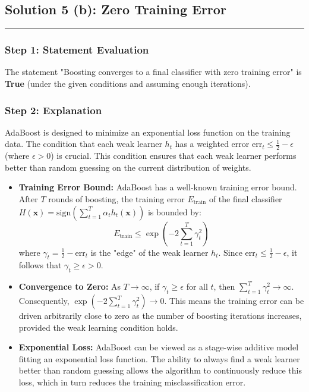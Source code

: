 \documentclass{article}
\begin{document}
\subsection*{Solution 5 (b): Zero Training Error}
\noindent\rule{\textwidth}{0.4pt}

\subsubsection*{Step 1: Statement Evaluation}
\parbox{\textwidth}{
The statement "Boosting converges to a final classifier with zero training error" is \textbf{True} (under the given conditions and assuming enough iterations).
}

\subsubsection*{Step 2: Explanation}
\parbox{\textwidth}{
AdaBoost is designed to minimize an exponential loss function on the training data. The condition that each weak learner $h_t$ has a weighted error $\text{err}_t \le \frac{1}{2} - \epsilon$ (where $\epsilon > 0$) is crucial. This condition ensures that each weak learner performs better than random guessing on the current distribution of weights.
\begin{itemize}
    \item \textbf{Training Error Bound:} AdaBoost has a well-known training error bound. After $T$ rounds of boosting, the training error $E_{\text{train}}$ of the final classifier $H(\mathbf{x}) = \text{sign}(\sum_{t=1}^T \alpha_t h_t(\mathbf{x}))$ is bounded by:
    $$ E_{\text{train}} \le \exp\left(-2 \sum_{t=1}^T \gamma_t^2\right) $$
    where $\gamma_t = \frac{1}{2} - \text{err}_t$ is the "edge" of the weak learner $h_t$. Since $\text{err}_t \le \frac{1}{2} - \epsilon$, it follows that $\gamma_t \ge \epsilon > 0$.
    \item \textbf{Convergence to Zero:} As $T \to \infty$, if $\gamma_t \ge \epsilon$ for all $t$, then $\sum_{t=1}^T \gamma_t^2 \to \infty$. Consequently, $\exp(-2 \sum_{t=1}^T \gamma_t^2) \to 0$.
    This means the training error can be driven arbitrarily close to zero as the number of boosting iterations increases, provided the weak learning condition holds.
    \item \textbf{Exponential Loss:} AdaBoost can be viewed as a stage-wise additive model fitting an exponential loss function. The ability to always find a weak learner better than random guessing allows the algorithm to continuously reduce this loss, which in turn reduces the training misclassification error.
\end{itemize}
}
\end{document}
